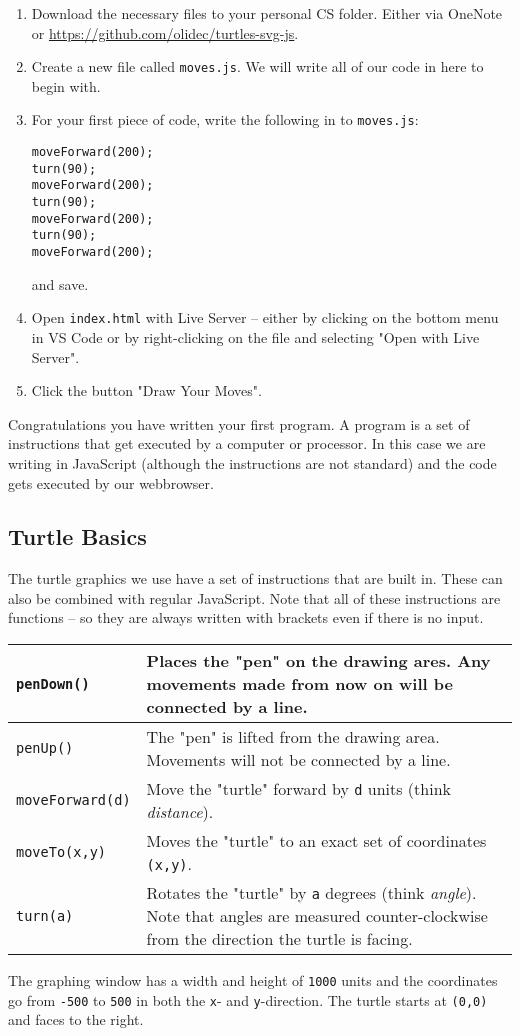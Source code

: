 \documentclass[english,11pt,a4paper]{report}
\begin{document}
\begin{enumerate}
\item Download the necessary files to your personal CS folder. Either via OneNote or \url{https://github.com/olidec/turtles-svg-js}.
\item Create a new file called \verb|moves.js|. We will write all of our code in here to begin with.
\item For your first piece of code, write the following in to \verb|moves.js|:
\begin{verbatim}
moveForward(200);
turn(90);
moveForward(200);
turn(90);
moveForward(200);
turn(90);
moveForward(200);
\end{verbatim}
and save.
\item Open \verb|index.html| with Live Server -- either by clicking on the bottom menu in VS Code or by right-clicking on the file and selecting "Open with Live Server".
\item Click the button "Draw Your Moves".
\end{enumerate}

Congratulations you have written your first program. A program is a set of instructions that get executed by a computer or processor. In this case we are writing in JavaScript (although the instructions are not standard) and the code gets executed by our webbrowser.

\subsection{Turtle Basics}

The turtle graphics we use have a set of instructions that are built in. These can also be combined with regular JavaScript. Note that all of these instructions are functions -- so they are always written with brackets even if there is no input.
\renewcommand{\arraystretch}{1.5}
\begin{center}
\begin{tabular}{p{3cm}|p{8cm}}
\verb|penDown()| & Places the "pen" on the drawing ares. Any movements made from now on will be connected by a line. \\
\hline
\verb|penUp()| & The "pen" is lifted from the drawing area. Movements will not be connected by a line.  \\
\hline
\verb|moveForward(d)| & Move the "turtle" forward by \verb|d| units (think \emph{distance}).  \\
\hline
\verb|moveTo(x,y)| & Moves the "turtle" to an exact set of coordinates \verb|(x,y)|. \\
\hline
\verb|turn(a)| & Rotates the "turtle" by \verb|a| degrees (think \emph{angle}). Note that angles are measured counter-clockwise from the direction the turtle is facing. 
\end{tabular}
\end{center}
The graphing window has a width and height of \verb|1000| units and the coordinates go from \verb|-500| to \verb|500| in both  the \verb|x|- and \verb|y|-direction. The turtle starts at \verb|(0,0)| and faces to the right.
\end{document}
